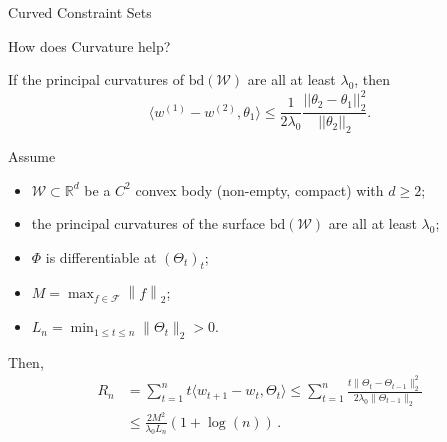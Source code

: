 \documentclass[final]{beamer} %
\newcommand{\cW}{\mathcal{W}}
\newcommand{\cF}{\mathcal{F}}
\newcommand{\bd}{\mathrm{bd}}
\newcommand{\R}{\mathbb{R}}
\newcommand{\norm}[1]{\left\| #1 \right\|}
\newcommand{\ip}[1]{\langle#1\rangle}
\begin{document}
\begin{frame}[c]
\begin{columns}[t,totalwidth=\textwidth]
\begin{column}{.32\textwidth}
\begin{block}{Curved Constraint Sets}
\begin{minipage}{0.95\textwidth}
\begin{block}{How does Curvature help?}
\begin{minipage}[b]{0.4\textwidth}
					\end{minipage}
				\end{block}
			\end{minipage}
			\begin{tcolorbox}[title = \vspace{0.4cm}{Curvature and Stability} \vspace{0.4cm}, title filled, colbacktitle = uofagreen!10, width = 0.9\textwidth, colback = uofagreen!10, colframe = red, coltitle = black, arc = 16pt]
				If the principal curvatures of $\bd(\cW)$ are all at least $\lambda_0$, then 
				\[
				\langle w^{(1)} - w^{(2)} , \theta_1 \rangle \le \frac{1}{2\lambda_0} \frac{||\theta_2 - \theta_1||_2^2}{||\theta_2||_2}.
				\]
			\end{tcolorbox}
			
			\bigskip
			
			\begin{tcolorbox}[title = \vspace{0.4cm}\textbf{\large Result I (Upper Bound)} \vspace{0.4cm}, title filled, width = 0.9\textwidth, colback = uofagreen!10, colframe = red, arc = 16pt]
				Assume
				\begin{itemize}
					\item $\cW\subset \R^d$ be a $C^2$ convex body (non-empty, compact) with $d \ge 2$;
					\item the principal curvatures of the surface $\bd(\cW)$ are all at least $\lambda_0$;
					\item $\Phi$ is differentiable at $(\Theta_t)_{t}$;
					\item $M = \max_{f\in \cF} \norm{f}_2$;
					\item  $L_n=\min_{1\le t \le n} \|\Theta_t\|_2 >0$. 
				\end{itemize}
					Then,
					\begin{align*}
					R_n & = \sum_{t=1}^{n} t\ip{ w_{t+1}-w_t,\Theta_t} %
					\le \sum_{t=1}^{n}  \frac{t \|\Theta_t - \Theta_{t-1}\|_2^2}{2\lambda_0 \|\Theta_{t-1}\|_2} \\
					& \le \frac{2M^2}{\lambda_0 L_n}(1+ \log(n))\,.
					\end{align*}
			\end{tcolorbox}

			\bigskip
			

\end{block}
\end{column}
\end{columns}
\end{frame}
\end{document}
